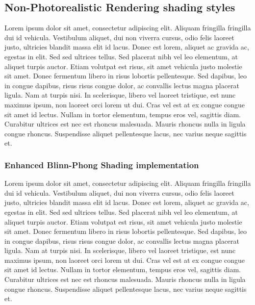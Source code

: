 \subsection{Non-Photorealistic Rendering shading styles}
Lorem ipsum dolor sit amet, consectetur adipiscing elit. Aliquam fringilla fringilla dui id vehicula. Vestibulum aliquet, dui non viverra cursus, odio felis laoreet justo, ultricies blandit massa elit id lacus. Donec est lorem, aliquet ac gravida ac, egestas in elit. Sed sed ultrices tellus. Sed placerat nibh vel leo elementum, at aliquet turpis auctor. Etiam volutpat est risus, sit amet vehicula justo molestie sit amet. Donec fermentum libero in risus lobortis pellentesque. Sed dapibus, leo in congue dapibus, risus risus congue dolor, ac convallis lectus magna placerat ligula. Nam at turpis nisi. In scelerisque, libero vel laoreet tristique, est nunc maximus ipsum, non laoreet orci lorem ut dui. Cras vel est at ex congue congue sit amet id lectus. Nullam in tortor elementum, tempus eros vel, sagittis diam. Curabitur ultrices est nec est rhoncus malesuada. Mauris rhoncus nulla in ligula congue rhoncus. Suspendisse aliquet pellentesque lacus, nec varius neque sagittis et.
\subsubsection{Enhanced Blinn-Phong Shading implementation}
Lorem ipsum dolor sit amet, consectetur adipiscing elit. Aliquam fringilla fringilla dui id vehicula. Vestibulum aliquet, dui non viverra cursus, odio felis laoreet justo, ultricies blandit massa elit id lacus. Donec est lorem, aliquet ac gravida ac, egestas in elit. Sed sed ultrices tellus. Sed placerat nibh vel leo elementum, at aliquet turpis auctor. Etiam volutpat est risus, sit amet vehicula justo molestie sit amet. Donec fermentum libero in risus lobortis pellentesque. Sed dapibus, leo in congue dapibus, risus risus congue dolor, ac convallis lectus magna placerat ligula. Nam at turpis nisi. In scelerisque, libero vel laoreet tristique, est nunc maximus ipsum, non laoreet orci lorem ut dui. Cras vel est at ex congue congue sit amet id lectus. Nullam in tortor elementum, tempus eros vel, sagittis diam. Curabitur ultrices est nec est rhoncus malesuada. Mauris rhoncus nulla in ligula congue rhoncus. Suspendisse aliquet pellentesque lacus, nec varius neque sagittis et.
